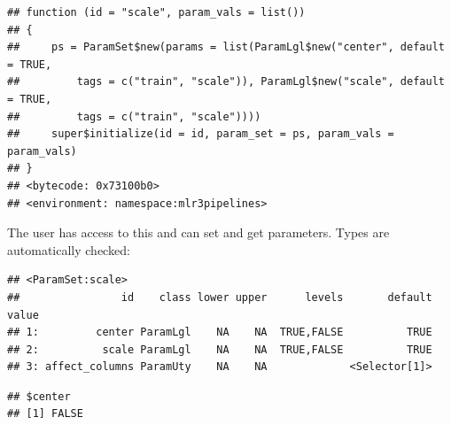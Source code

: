 \documentclass[]{scrbook}
\newenvironment{Shaded}{\begin{snugshade}}{\end{snugshade}}
\newcommand{\CommentTok}[1]{\textcolor[rgb]{0.56,0.35,0.01}{\textit{#1}}}
\newcommand{\KeywordTok}[1]{\textcolor[rgb]{0.13,0.29,0.53}{\textbf{#1}}}
\newcommand{\NormalTok}[1]{#1}
\newcommand{\OperatorTok}[1]{\textcolor[rgb]{0.81,0.36,0.00}{\textbf{#1}}}
\newcommand{\OtherTok}[1]{\textcolor[rgb]{0.56,0.35,0.01}{#1}}
\newcommand{\StringTok}[1]{\textcolor[rgb]{0.31,0.60,0.02}{#1}}
\renewenvironment{Shaded} {\begin{snugshade}\small} {\end{snugshade}}
\begin{document}
\begin{verbatim}
## function (id = "scale", param_vals = list()) 
## {
##     ps = ParamSet$new(params = list(ParamLgl$new("center", default = TRUE, 
##         tags = c("train", "scale")), ParamLgl$new("scale", default = TRUE, 
##         tags = c("train", "scale"))))
##     super$initialize(id = id, param_set = ps, param_vals = param_vals)
## }
## <bytecode: 0x73100b0>
## <environment: namespace:mlr3pipelines>
\end{verbatim}

The user has access to this and can set and get parameters. Types are automatically checked:

\begin{Shaded}
\end{Shaded}

\begin{verbatim}
## <ParamSet:scale>
##                id    class lower upper      levels       default value
## 1:         center ParamLgl    NA    NA  TRUE,FALSE          TRUE      
## 2:          scale ParamLgl    NA    NA  TRUE,FALSE          TRUE      
## 3: affect_columns ParamUty    NA    NA             <Selector[1]>
\end{verbatim}

\begin{Shaded}
\end{Shaded}

\begin{verbatim}
## $center
## [1] FALSE
\end{verbatim}

\begin{Shaded}
\end{Shaded}
\end{document}
